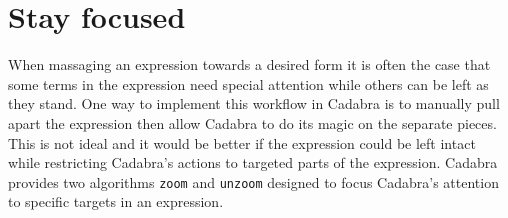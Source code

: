 \documentclass[a4paper,12pt]{article}
\numberwithin{equation}{section}%
\begin{document}

\clearpage

\section{Stay focused}
\label{sec:ex-05}
\setcounter{ExerciseNum}{0}



When massaging an expression towards a desired form it is often the case that some terms in
the expression need special attention while others can be left as they stand. One way to
implement this workflow in Cadabra is to manually pull apart the expression then allow
Cadabra to do its magic on the separate pieces. This is not ideal and it would be better if
the expression could be left intact while restricting Cadabra's actions to targeted parts of
the expression. Cadabra provides two algorithms \verb|zoom| and \verb|unzoom| designed to
focus Cadabra's attention to specific targets in an expression.
\end{document}
